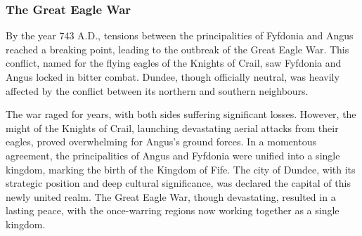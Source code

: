 \subsubsection*{The Great Eagle War}
{\entryfont By the year 743 A.D., tensions between the principalities of Fyfdonia and Angus reached a breaking point, leading to the outbreak of the Great Eagle War. This conflict, named for the flying eagles of the Knights of Crail, saw Fyfdonia and Angus locked in bitter combat. Dundee, though officially neutral, was heavily affected by the conflict between its northern and southern neighbours.

The war raged for years, with both sides suffering significant losses. However, the might of the Knights of Crail, launching devastating aerial attacks from their eagles, proved overwhelming for Angus's ground forces. In a momentous agreement, the principalities of Angus and Fyfdonia were unified into a single kingdom, marking the birth of the Kingdom of Fife. The city of Dundee, with its strategic position and deep cultural significance, was declared the capital of this newly united realm. The Great Eagle War, though devastating, resulted in a lasting peace, with the once-warring regions now working together as a single kingdom.}

